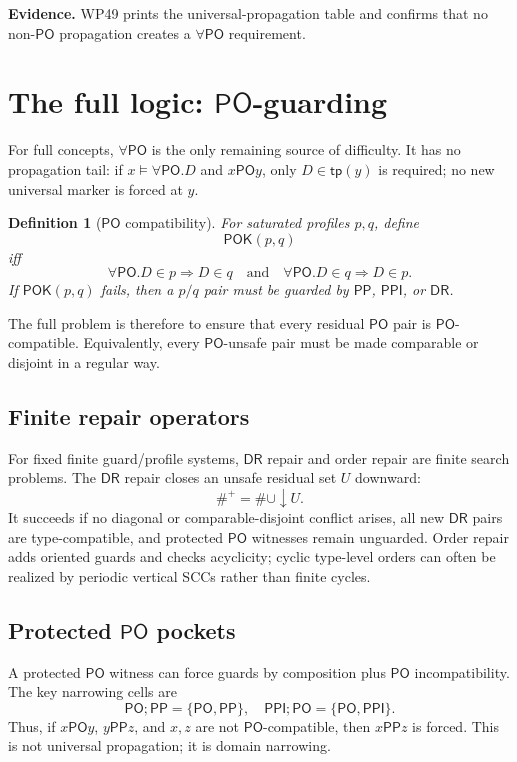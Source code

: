 \documentclass[11pt]{article}
\newtheorem{definition}[theorem]{Definition}
\newcommand{\PP}{\mathsf{PP}}
\newcommand{\PPI}{\mathsf{PPI}}
\newcommand{\PO}{\mathsf{PO}}
\newcommand{\DR}{\mathsf{DR}}
\newcommand{\tp}{\mathsf{tp}}
\newcommand{\POK}{\mathsf{POK}}
\newcommand{\down}{\downarrow}
\begin{document}
\noindent\textbf{Evidence.} WP49 prints the universal-propagation table and confirms that no non-$\PO$ propagation creates a $\forall\PO$ requirement.

\section{The full logic: $\PO$-guarding}

For full concepts, $\forall\PO$ is the only remaining source of difficulty.  It has no propagation tail: if $x\models\forall\PO.D$ and $x\PO y$, only $D\in\tp(y)$ is required; no new universal marker is forced at $y$.

\begin{definition}[$\PO$ compatibility]
For saturated profiles $p,q$, define
\[
\POK(p,q)
\]
iff
\[
\forall\PO.D\in p\Rightarrow D\in q
\quad\text{and}\quad
\forall\PO.D\in q\Rightarrow D\in p.
\]
If $\POK(p,q)$ fails, then a $p/q$ pair must be guarded by $\PP$, $\PPI$, or $\DR$.
\end{definition}

The full problem is therefore to ensure that every residual $\PO$ pair is $\PO$-compatible.  Equivalently, every $\PO$-unsafe pair must be made comparable or disjoint in a regular way.

\subsection{Finite repair operators}
For fixed finite guard/profile systems, $\DR$ repair and order repair are finite search problems.  The $\DR$ repair closes an unsafe residual set $U$ downward:
\[
\#^+ = \#\cup \down U.
\]
It succeeds if no diagonal or comparable-disjoint conflict arises, all new $\DR$ pairs are type-compatible, and protected $\PO$ witnesses remain unguarded.  Order repair adds oriented guards and checks acyclicity; cyclic type-level orders can often be realized by periodic vertical SCCs rather than finite cycles.

\subsection{Protected $\PO$ pockets}
A protected $\PO$ witness can force guards by composition plus $\PO$ incompatibility.  The key narrowing cells are
\[
\PO;\PP=\{\PO,\PP\},
\quad
\PPI;\PO=\{\PO,\PPI\}.
\]
Thus, if $x\PO y$, $y\PP z$, and $x,z$ are not $\PO$-compatible, then $x\PP z$ is forced.  This is not universal propagation; it is domain narrowing.
\end{document}
